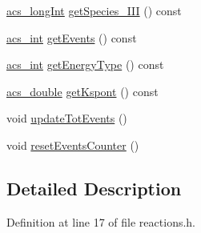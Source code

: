 \begin{DoxyCompactItemize}
\item 
\hyperlink{a00050_a19319d75f02db4308bc5c0026d98cd85}{acs\+\_\+long\+Int} \hyperlink{a00020_aaf426633019113ac4ae54cd5597920be}{get\+Species\+\_\+\+I\+I\+I} () const 
\item 
\hyperlink{a00050_a8d277355641a098190360234e2ebde35}{acs\+\_\+int} \hyperlink{a00020_a4fd82a3f1a6474e53709c2a8c04b793c}{get\+Events} () const 
\item 
\hyperlink{a00050_a8d277355641a098190360234e2ebde35}{acs\+\_\+int} \hyperlink{a00020_ae6fce196577644283fdab4a78909d891}{get\+Energy\+Type} () const 
\item 
\hyperlink{a00050_ab776853a005fcbf56af0424a2a4dd607}{acs\+\_\+double} \hyperlink{a00020_a3cac13cba00c709df26485bbeffda4f0}{get\+Kspont} () const 
\item 
void \hyperlink{a00020_ae7a0bcb1c921c25ad5dc637d664f2c94}{update\+Tot\+Events} ()
\item 
void \hyperlink{a00020_a614a367a15dda1df4160bcdc170a9b32}{reset\+Events\+Counter} ()
\end{DoxyCompactItemize}


\subsection{Detailed Description}


Definition at line 17 of file reactions.\+h.



